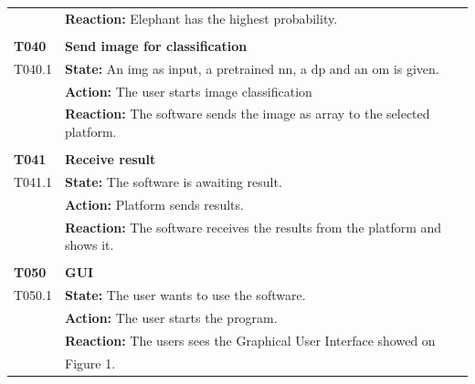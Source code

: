\documentclass[parskip=full]{scrartcl}
\begin{document}
\begin{tabular}{p{2cm}p{11.4cm}}
& \textbf{Reaction:} Elephant has the highest probability. \\
& \\
\textbf{T040} \hypertarget{T040} & \textbf{Send image for classification} \\
T040.1 & \textbf{State:} An \gls{img} as input, a pretrained \gls{nn}, a \gls{dp} and an \gls{om} is given. \\
& \textbf{Action:} The user starts \gls{image classification}  \\
& \textbf{Reaction:} The software sends the image as array to the selected platform.\\
& \\
\textbf{T041} \hypertarget{T041} & \textbf{Receive result}\\
T041.1 & \textbf{State:} The software is awaiting result. \\
& \textbf{Action:} Platform sends results. \\
& \textbf{Reaction:} The software receives the results from the platform and shows it. \\
& \\
\textbf{T050} \hypertarget{T050} & \textbf{GUI} \\
T050.1 & \textbf{State:} The user wants to use the software.\\
& \textbf{Action:} The user starts the program.  \\
& \textbf{Reaction:} The users sees the Graphical User Interface showed on \\
& Figure 1. \\
\end{tabular}
\newpage
\end{document}
